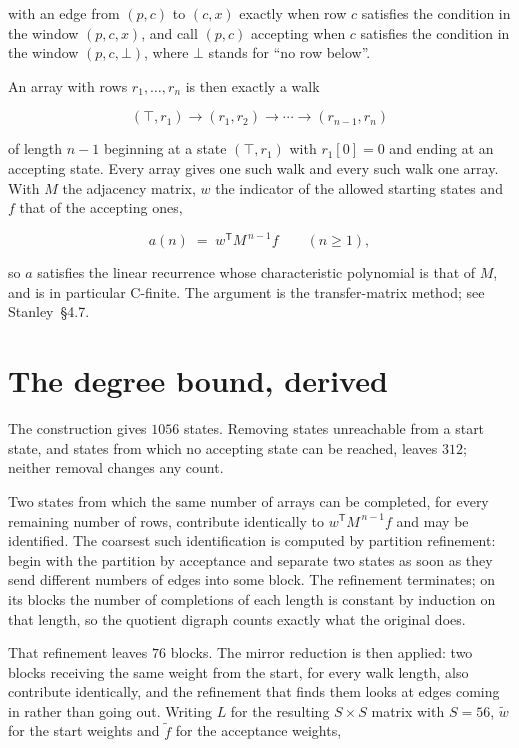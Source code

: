 \documentclass[11pt]{article}
\theoremstyle{definition}
\begin{document}
with an edge from $(p,c)$ to $(c,x)$ exactly when row $c$ satisfies the condition in the window $(p,c,x)$, and call $(p,c)$ accepting when $c$ satisfies the condition in the window $(p,c,\bot)$, where $\bot$ stands for ``no row below''.

An array with rows $r_1,\dots,r_n$ is then exactly a walk

\[(\top,r_1) \to (r_1,r_2) \to \cdots \to (r_{n-1},r_n)\]

of length $n-1$ beginning at a state $(\top,r_1)$ with $r_1[0]=0$ and ending at an accepting state. Every array gives one such walk and every such walk one array. With $M$ the adjacency matrix, $w$ the indicator of the allowed starting states and $f$ that of the accepting ones,

\[a(n) \;=\; w^{\mathsf T} M^{\,n-1} f \qquad (n \ge 1),\]

so $a$ satisfies the linear recurrence whose characteristic polynomial is that of $M$, and is in particular C-finite. The argument is the transfer-matrix method; see Stanley~\S4.7.

\section{The degree bound, derived}

The construction gives $1056$ states. Removing states unreachable from a start state, and states from which no accepting state can be reached, leaves $312$; neither removal changes any count.

Two states from which the same number of arrays can be completed, for every remaining number of rows, contribute identically to $w^{\mathsf T}M^{\,n-1}f$ and may be identified. The coarsest such identification is computed by partition refinement: begin with the partition by acceptance and separate two states as soon as they send different numbers of edges into some block. The refinement terminates; on its blocks the number of completions of each length is constant by induction on that length, so the quotient digraph counts exactly what the original does.

That refinement leaves $76$ blocks. The mirror reduction is then applied: two blocks receiving the same weight from the start, for every walk length, also contribute identically, and the refinement that finds them looks at edges coming in rather than going out. Writing $L$ for the resulting $S \times S$ matrix with $S = 56$, $\tilde w$ for the start weights and $\tilde f$ for the acceptance weights,
\end{document}
